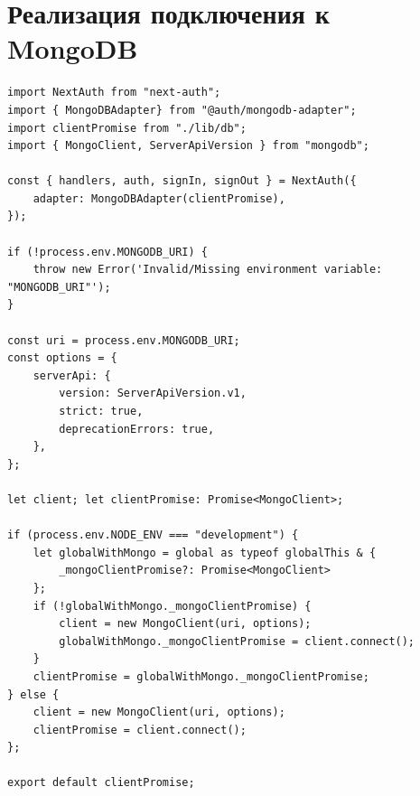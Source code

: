 \documentclass[master, och, diploma]{SCWorks}
\begin{document}


\appendix

\section{Реализация подключения к MongoDB}
\begin{verbatim}
import NextAuth from "next-auth";
import { MongoDBAdapter} from "@auth/mongodb-adapter";
import clientPromise from "./lib/db";
import { MongoClient, ServerApiVersion } from "mongodb";

const { handlers, auth, signIn, signOut } = NextAuth({
    adapter: MongoDBAdapter(clientPromise),
});

if (!process.env.MONGODB_URI) {
    throw new Error('Invalid/Missing environment variable: "MONGODB_URI"');
}

const uri = process.env.MONGODB_URI;
const options = {
    serverApi: {
        version: ServerApiVersion.v1,
        strict: true,
        deprecationErrors: true,
    },
};

let client; let clientPromise: Promise<MongoClient>;
 
if (process.env.NODE_ENV === "development") {
    let globalWithMongo = global as typeof globalThis & {
        _mongoClientPromise?: Promise<MongoClient>
    };
    if (!globalWithMongo._mongoClientPromise) {
        client = new MongoClient(uri, options);
        globalWithMongo._mongoClientPromise = client.connect();
    }
    clientPromise = globalWithMongo._mongoClientPromise;
} else {
    client = new MongoClient(uri, options);
    clientPromise = client.connect();
};

export default clientPromise;
\end{verbatim}
\end{document}
